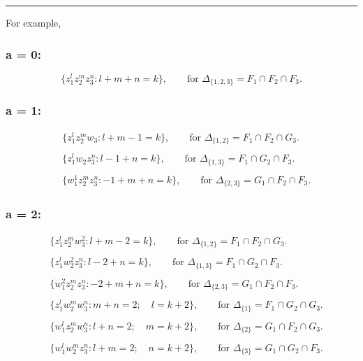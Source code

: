\documentclass[11pt]{article}
\begin{document}
\begin{center}\rule{0.5\linewidth}{0.5pt}\end{center}

For example,

\hypertarget{a-0}{%
\subsubsection{a = 0:}\label{a-0}}

\[ \{ z_{1}^{l}z_{2}^{m}z_{3}^{n} : l + m + n = k \}, \qquad \text{for } \Delta_{\{1,2,3\}} = F_{1} \cap F_{2} \cap F_{3}. \]

\hypertarget{a-1}{%
\subsubsection{a = 1:}\label{a-1}}

\[ \begin{split} &\{ z_{1}^{l}z_{2}^{m}w_{3} : l + m - 1 = k \}, \qquad \text{for } \Delta_{\{1,2\}} = F_{1} \cap F_{2} \cap G_{3}. \\ & \\ &\{ z_{1}^{l}w_{2}z_{3}^{n} : l - 1 + n = k \}, \qquad \text{for } \Delta_{\{1,3\}} = F_{1} \cap G_{2} \cap F_{3}. \\ \ & \\ &\{ w_{1}^{1}z_{2}^{m}z_{3}^{n} : -1 + m + n = k \}, \qquad \text{for } \Delta_{\{2,3\}} = G_{1} \cap F_{2} \cap F_{3}. \end{split} \]

\hypertarget{a-2}{%
\subsubsection{a = 2:}\label{a-2}}

\[ \begin{split} &\{ z_{1}^{l}z_{2}^{m}w_{3}^{2} : l + m - 2 = k \}, \qquad \text{for } \Delta_{\{1,2\}} = F_{1} \cap F_{2} \cap G_{3}. \\ & \\ &\{ z_{1}^{l}w_{2}^{2}z_{3}^{n} : l - 2 + n = k \}, \qquad \text{for } \Delta_{\{1,3\}} = F_{1} \cap G_{2} \cap F_{3}. \\ \ & \\ &\{ w_{1}^{2}z_{2}^{m}z_{3}^{n} : -2 + m + n = k \}, \qquad \text{for } \Delta_{\{2,3\}} = G_{1} \cap F_{2} \cap F_{3}. \\ & \\ & \{ z_{1}^{l}w_{2}^{m}w_{3}^{n} : m + n = 2;\quad l = k + 2 \}, \qquad \text{for } \Delta_{\{1\}} = F_{1} \cap G_{2} \cap G_{3}. \\ & \\ &\{ w_{1}^{l}z_{2}^{m}w_{3}^{n} : l + n = 2;\quad m = k + 2 \}, \qquad \text{for } \Delta_{\{2\}} = G_{1} \cap F_{2} \cap G_{3}. \\ & \\ &\{ w_{1}^{l}w_{2}^{m}z_{3}^{n} : l + m = 2;\quad n = k + 2 \}, \qquad \text{for } \Delta_{\{3\}} = G_{1} \cap G_{2} \cap F_{3}. \end{split} \]
\end{document}
